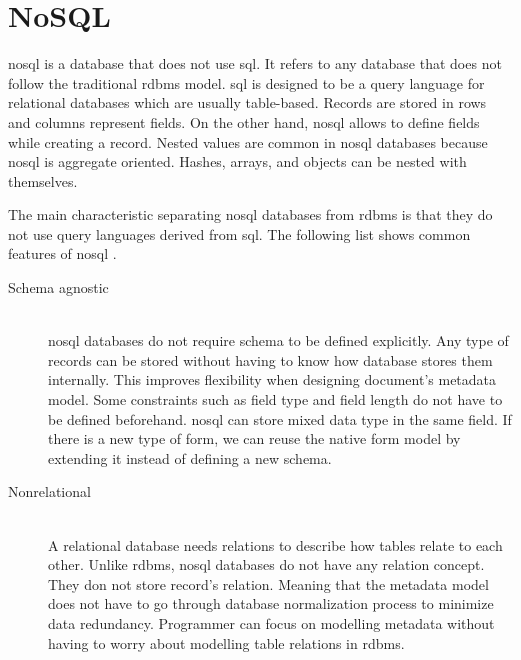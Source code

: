 \section{NoSQL}
\gls{nosql} is a database that does not use \gls{sql}.
It refers to any database that does not follow the traditional \gls{rdbms} model.
\gls{sql} is designed to be a query language for relational databases which are usually table-based.
Records are stored in rows and columns represent fields.
On the other hand, \gls{nosql} allows to define fields while creating a record.
Nested values are common in \gls{nosql} databases because \gls{nosql} is aggregate oriented.
Hashes, arrays, and objects can be nested with themselves.

The main characteristic separating \gls{nosql} databases from \gls{rdbms} is that they do not use query languages derived from \gls{sql}. 
The following list shows common features of \gls{nosql} \cite[p.~12-16]{nosql-for-dummies}.
\begin{description}
	\item[Schema agnostic] \hfill \\
	\gls{nosql} databases do not require schema to be defined explicitly.
	Any type of records can be stored without having to know how database stores them internally.
	This improves flexibility when designing document's metadata model.
	Some constraints such as field type and field length do not have to be defined beforehand.
	\gls{nosql} can store mixed data type in the same field.
	If there is a new type of form, we can reuse the native form model by extending it instead of defining a new schema.
	\item[Nonrelational] \hfill \\
	A relational database needs relations to describe how tables relate to each other.
	Unlike \gls{rdbms}, \gls{nosql} databases do not have any relation concept.
	They don not store record's relation.
	Meaning that the metadata model does not have to go through database normalization process to minimize data redundancy.
	Programmer can focus on modelling metadata without having to worry about modelling table relations in \gls{rdbms}.
	
\end{description}

